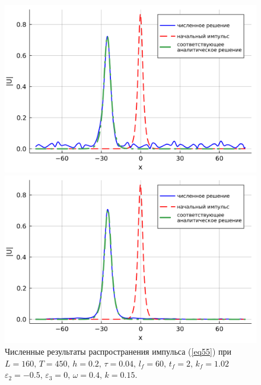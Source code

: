 \documentclass[14pt,a4paper]{extreport}
\begin{document}
			\begin{figure}[H] %
				\begin{center}
					\begin{minipage}[h]{0.48\linewidth}
						\includegraphics[width=1\linewidth]{fig63.png}
					\end{minipage}
					\hfill
					\begin{minipage}[h]{0.48\linewidth}
						\includegraphics[width=1\linewidth]{fig64.png}
					\end{minipage}
				\end{center}
				\caption{Численные результаты распространения импульса (\ref{eq55}) при
				\(L=160,\, T=450,\, h=0.2,\, \tau=0.04,\,l_{f}=60,\, t_{f}=2, \, k_{f}=1.02\)
				\(\varepsilon_{2}=-0.5,\,\varepsilon_{3}=0,\, \omega=0.4,\, k=0.15\).}
				\label{340-2}
			\end{figure}
\end{document}
